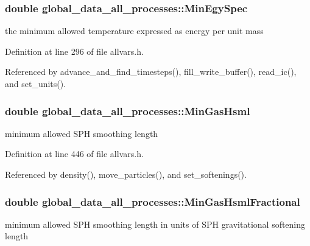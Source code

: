 \hypertarget{structglobal__data__all__processes_ae298f2b76a8f1d0b932bee24c28987cf}{
\subsubsection[{MinEgySpec}]{\setlength{\rightskip}{0pt plus 5cm}double {\bf global\_\-data\_\-all\_\-processes::MinEgySpec}}}
\label{structglobal__data__all__processes_ae298f2b76a8f1d0b932bee24c28987cf}
the minimum allowed temperature expressed as energy per unit mass 

Definition at line 296 of file allvars.h.



Referenced by advance\_\-and\_\-find\_\-timesteps(), fill\_\-write\_\-buffer(), read\_\-ic(), and set\_\-units().

\hypertarget{structglobal__data__all__processes_aec92c94dd2a1d0f0e1ad56f2e790384a}{
\subsubsection[{MinGasHsml}]{\setlength{\rightskip}{0pt plus 5cm}double {\bf global\_\-data\_\-all\_\-processes::MinGasHsml}}}
\label{structglobal__data__all__processes_aec92c94dd2a1d0f0e1ad56f2e790384a}
minimum allowed SPH smoothing length 

Definition at line 446 of file allvars.h.



Referenced by density(), move\_\-particles(), and set\_\-softenings().

\hypertarget{structglobal__data__all__processes_acddf5d973c6847405b85f4531d5b7510}{
\subsubsection[{MinGasHsmlFractional}]{\setlength{\rightskip}{0pt plus 5cm}double {\bf global\_\-data\_\-all\_\-processes::MinGasHsmlFractional}}}
\label{structglobal__data__all__processes_acddf5d973c6847405b85f4531d5b7510}
minimum allowed SPH smoothing length in units of SPH gravitational softening length 

